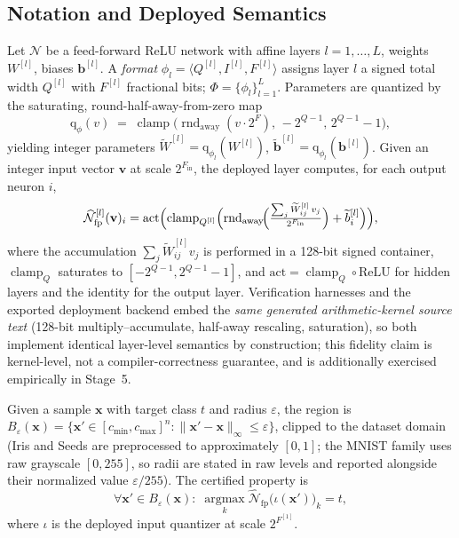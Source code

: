 \subsection{Notation and Deployed Semantics}
\label{sec:semantics}
 
Let $\mathcal{N}$ be a feed-forward ReLU network with affine layers
$l = 1,\dots,L$, weights $W^{[l]}$, biases $\mathbf{b}^{[l]}$. A
\emph{format} $\phi_l = \langle Q^{[l]}, I^{[l]}, F^{[l]}\rangle$
assigns layer $l$ a signed total width $Q^{[l]}$ with $F^{[l]}$
fractional bits; $\Phi = \{\phi_l\}_{l=1}^{L}$. Parameters are
quantized by the saturating, round-half-away-from-zero map
\begin{equation}
  \mathrm{q}_{\phi}(v) \;=\; \operatorname{clamp}\!\bigl(
    \operatorname{rnd}_{\mathrm{away}}(v\cdot 2^{F}),\,
    -2^{Q-1},\, 2^{Q-1}\!-\!1\bigr),
  \label{eq:quantizer}
\end{equation}
yielding integer parameters
$\widetilde{W}^{[l]} = \mathrm{q}_{\phi_l}(W^{[l]})$,
$\widetilde{\mathbf{b}}^{[l]} = \mathrm{q}_{\phi_l}(\mathbf{b}^{[l]})$.
Given an integer input vector $\mathbf{v}$ at scale $2^{F_{\mathrm{in}}}$,
the deployed layer computes, for each output neuron $i$,
\begin{equation}
  \widehat{\mathcal{N}}^{[l]}_{\mathrm{fp}}(\mathbf{v})_i =
  \mathrm{act}\Bigl(
  \operatorname{clamp}_{Q^{[l]}}\Bigl(
    \operatorname{rnd}_{\mathrm{away}}\!\Bigl(
      \tfrac{\sum_j \widetilde{W}^{[l]}_{ij}\, v_j}{2^{F_{\mathrm{in}}}}
    \Bigr) + \widetilde{b}^{[l]}_i
  \Bigr)\Bigr),
  \label{eq:kernel}
\end{equation}
where the accumulation $\sum_j \widetilde{W}^{[l]}_{ij} v_j$ is
performed in a 128-bit signed container, $\operatorname{clamp}_{Q}$
saturates to $[-2^{Q-1}, 2^{Q-1}\!-\!1]$, and
$\mathrm{act} = \operatorname{clamp}_{Q}\circ\mathrm{ReLU}$ for hidden
layers and the identity for the output layer. Verification harnesses
and the exported deployment backend embed the \emph{same generated
arithmetic-kernel source text} (128-bit multiply--accumulate,
half-away rescaling, saturation), so both implement identical
layer-level semantics by construction; this fidelity claim is
kernel-level, not a compiler-correctness guarantee, and is additionally
exercised empirically in Stage~5.
 
Given a sample $\mathbf{x}$ with target class $t$ and radius
$\varepsilon$, the region is
$B_\varepsilon(\mathbf{x}) = \{\mathbf{x}' \in [c_{\min},c_{\max}]^n :
\|\mathbf{x}'-\mathbf{x}\|_\infty \le \varepsilon\}$, clipped to the
dataset domain (Iris and Seeds are preprocessed to approximately
$[0,1]$; the MNIST family uses raw grayscale $[0,255]$, so radii are
stated in raw levels and reported alongside their normalized value
$\varepsilon/255$). The certified property is
\begin{equation}
  \forall \mathbf{x}' \in B_\varepsilon(\mathbf{x})\colon\;
  \operatorname*{argmax}_k
  \widehat{\mathcal{N}}_{\mathrm{fp}}\bigl(\iota(\mathbf{x}')\bigr)_k
  = t,
  \label{eq:property}
\end{equation}
where $\iota$ is the deployed input quantizer at scale $2^{F^{[1]}}$.
 
